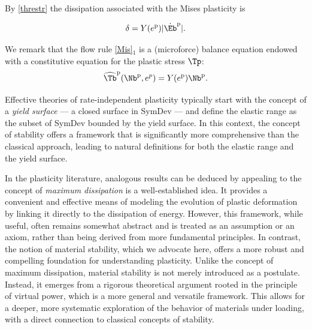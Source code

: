 By \eqref{threstr} the dissipation associated with the Mises plasticity is 
\begin{definition}
	\begin{equation}\label{dissPL}
\delta=Y(e^{\rm p} )|\dot{\Eb}^{\rm p}|.
\end{equation}
\end{definition}

We remark that the flow rule \eqref{Mis}$_1$ is a (microforce) balance equation endowed with a constitutive equation for the plastic stress $\Tp$:
\begin{equation}
\widehat{\Tb}^{\rm p}(\Nb^{\rm p}, e^{p})=Y(e^{\rm p})\Nb^{\rm p}.
\end{equation}

\begin{remark}
Effective theories of rate-independent plasticity typically start with the concept of a \textit{yield surface} — a closed surface in SymDev — and define the elastic range as the subset of SymDev bounded by the yield surface. In this context, the concept of stability offers a framework that is significantly more comprehensive than the classical approach, leading to natural definitions for both the elastic range and the yield surface.
\end{remark}


\begin{remark}
In the plasticity literature, analogous results can be deduced by appealing to  the concept of \textit{maximum dissipation} is  a well-established idea. It provides a convenient and effective means of modeling the evolution of plastic deformation by linking it directly to the dissipation of energy. However, this framework, while useful, often remains somewhat abstract and is treated as an assumption or an axiom, rather than being derived from more fundamental principles. In contrast, the notion of material stability, which we advocate here, offers a more robust and compelling foundation for understanding plasticity. Unlike the concept of maximum dissipation, material stability is not merely introduced as a postulate. Instead, it emerges from a rigorous theoretical argument rooted in the principle of virtual power, which is a more general and versatile framework. This allows for a deeper, more systematic exploration of the behavior of materials under loading, with a direct connection to classical concepts of stability.
\end{remark}


